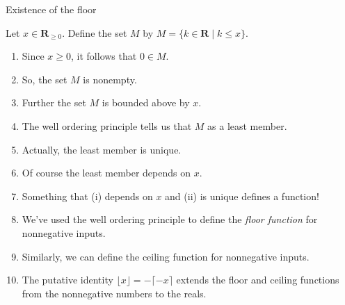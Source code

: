 \documentclass[fleqn]{beamer}
\newcommand{\reals}{\mathbf{R}}
\theoremstyle{definition}
\newenvironment{numberlist}
   {\begin{enumerate}[(1)]
       \addtolength{\itemsep}{-0.5\itemsep}}
     {\end{enumerate}}
\begin{document}
\begin{frame}{Existence of the floor}

Let \(x \in \reals_{\geq 0}\). Define the set \(M\) by
\(
     M = \{k \in \reals \mid k \leq x \}
\).

\begin{numberlist}

 \item Since \(x \geq 0\), it follows that \(0 \in M\).

\vspace{0.15in}
 \item So, the set \(M\) is nonempty.
\vspace{0.15in}
 \item Further the set \(M\) is bounded above by \(x\).
\vspace{0.15in}
  \item The well ordering principle tells us that \(M\) as
  a least member.
\vspace{0.15in}
  \item Actually, the least member is unique.
\vspace{0.15in}
  \item Of course the least member depends on \(x\).
\vspace{0.15in}
  \item Something that (i) depends on \(x\) and (ii) is unique defines a function!
\vspace{0.15in}
  \item We've used the well ordering principle to define the \emph{floor function} 
  for nonnegative inputs.

  \item Similarly, we can define the ceiling function for nonnegative inputs.

  \item The putative identity \(\lfloor x \rfloor = - \lceil -x \rceil \) extends the floor and ceiling functions from the nonnegative numbers to the reals.



\end{numberlist}
\end{frame}
\end{document}
